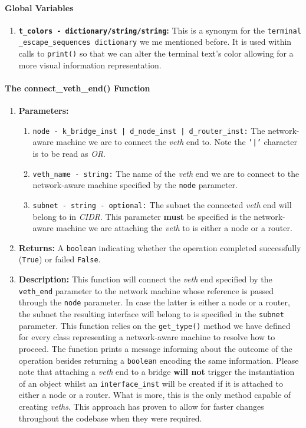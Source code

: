     \paragraph{Global Variables}
        \begin{enumerate}
            \item \textbf{\texttt{\allowbreak t\_colors - dictionary/string/string}:} This is a synonym for the \texttt{\allowbreak terminal \_escape\_sequences dictionary} we me mentioned before. It is used within calls to \texttt{print()} so that we can alter the terminal text's color allowing for a more visual information representation.
        \end{enumerate}

    \paragraph{The connect\_veth\_end() Function}
        \begin{enumerate}
            \item \textbf{Parameters:}
            \begin{enumerate}
                \item \texttt{node - k\_bridge\_inst | d\_node\_inst | d\_router\_inst:} The network-aware machine we are to connect the \textit{veth} end to. Note the \texttt{'|'} character is to be read as \textit{OR}.
                \item \texttt{veth\_name - string:} The name of the \textit{veth} end we are to connect to the network-aware machine specified by the \texttt{node} parameter.
                \item \texttt{subnet - string - optional:} The subnet the connected \textit{veth} end will belong to in \textit{CIDR}. This parameter \textbf{must} be specified is the network-aware machine we are attaching the \textit{veth} to is either a node or a router.
            \end{enumerate}
            \item \textbf{Returns:} A \texttt{boolean} indicating whether the operation completed successfully (\texttt{True}) or failed \texttt{False}.
            \item \textbf{Description:} This function will connect the \textit{veth} end specified by the \texttt{veth\_end} parameter to the network machine whose reference is passed through the \texttt{node} parameter. In case the latter is either a node or a router, the subnet the resulting interface will belong to is specified in the \texttt{subnet} parameter. This function relies on the \texttt{get\_type()} method we have defined for every class representing a network-aware machine to resolve how to proceed. The function prints a message informing about the outcome of the operation besides returning a \texttt{boolean} encoding the same information. Please note that attaching a \textit{veth} end to a bridge \textbf{will not} trigger the instantiation of an object whilst an \texttt{interface\_inst} will be created if it is attached to either a node or a router. What is more, this is the only method capable of creating \textit{veths}. This approach has proven to allow for faster changes throughout the codebase when they were required.
        \end{enumerate}

